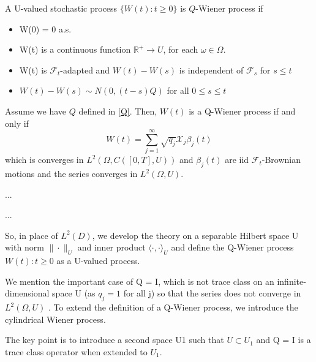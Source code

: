 \begin{definition}
    A U-valued stochastic process $\{W(t):t\geq 0\}$ is $Q$-Wiener process if 
    \begin{itemize}
        \item W(0) = 0 a.s.
        \item W(t) is a continuous function $\mathbb{R}^+\rightarrow U$, for each $\omega \in \Omega$.
        \item W(t) is $\mathcal{F}_t$-adapted and $W(t) - W(s)$ is independent of $\mathcal{F}_s$ for $s\leq t$
        \item $W(t) - W(s)\sim N(0, (t-s)Q)$ for all $0\leq s\leq t$
    \end{itemize}
\end{definition}

\begin{theorem}
    Assume we have $Q$ defined in \ref{Q}. Then, $W(t)$ is a Q-Wiener process if and only if 
    \begin{equation}
        W(t)=\sum_{j=1}^\infty \sqrt{q_j}\mathcal{X}_j\beta_j(t)
    \end{equation}
    which is converges in $L^2\left(\Omega, C([0, T], U)\right)$ and $\beta_j(t)$ are iid $\mathcal{F}_t$-Brownian motions and the series converges in $L^2(\Omega,U)$.
\end{theorem}


\begin{theorem}
    ...
\end{theorem}

\begin{theorem}
    ...
\end{theorem}

So, in place of $L^2(D)$, we develop the theory on a separable Hilbert space U with norm $\|\cdot\|_U$ and inner product $\langle \cdot, \cdot\rangle _U$ and define the Q-Wiener process ${W (t) : t \geq 0}$ as a U-valued process. 

We mention the important case of Q = I, which is not trace class on an infinite-dimensional space U (as $q_j = 1$ for all j) so that the series does not converge in $L^2(\Omega,U)$ . To extend the definition of a Q-Wiener process, we introduce the cylindrical Wiener process.

The key point is to introduce a second space U1 such that $U\subset U_1$ and Q = I is a trace class operator when extended to $U_1$. 

